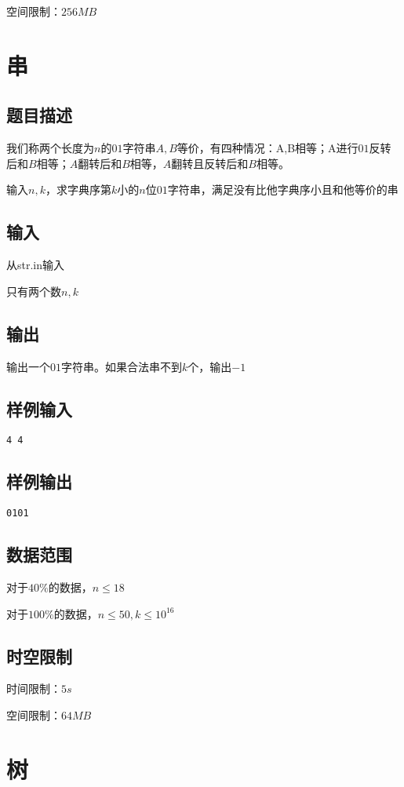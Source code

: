 \documentclass{ctexart}
\begin{document}
空间限制：$256MB$
\section{串}
\subsection{题目描述}
我们称两个长度为$n$的$01$字符串$A,B$等价，有四种情况：A,B相等；A进行$01$反转后和$B$相等；$A$翻转后和$B$相等，$A$翻转且反转后和$B$相等。

输入$n,k$，求字典序第$k$小的$n$位$01$字符串，满足没有比他字典序小且和他等价的串
\subsection{输入}
从str.in输入

只有两个数$n,k$
\subsection{输出}
输出一个$01$字符串。如果合法串不到$k$个，输出$-1$
\subsection{样例输入}
\begin{verbatim}
4 4
\end{verbatim}
\subsection{样例输出}
\begin{verbatim}
0101
\end{verbatim}
\subsection{数据范围}
对于$40\%$的数据，$n \le 18$

对于$100\%$的数据，$n \le 50,k \le 10^{16}$
\subsection{时空限制}
时间限制：$5s$

空间限制：$64MB$
\section{树}
\end{document}
